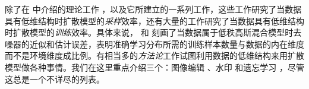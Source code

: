 \documentclass[../../book-main_zh.tex]{subfiles}
\begin{document}
除了在  中介绍的理论工作 \citep{li2024d}，以及它所建立的一系列工作，这些工作研究了当数据具有低维结构时扩散模型的\textit{采样}效率，还有大量的工作研究了当数据具有低维结构时扩散模型的\textit{训练}效率。具体来说，\citet{chen2023score} 和 \citep{wang2024diffusion} 刻画了当数据属于低秩高斯混合模型时去噪器的近似和估计误差，表明准确学习分布所需的训练样本数量与数据的内在维度而不是环境维度成比例。有相当多的\textit{方法论}工作试图利用数据的低维结构来用扩散模型做各种事情。我们在这里重点介绍三个：图像编辑 \citep{chen2024exploring}、水印 \citep{li2024shallow} 和遗忘学习 \citep{chen2025dual}，尽管这总是一个不详尽的列表。
 
\end{document}
